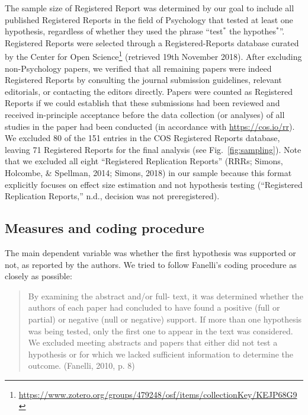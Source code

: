 \documentclass[british,,jou,floatsintext]{apa6}
\begin{document}
The sample size of Registered Report was determined by our goal to include all published Registered Reports in the field of Psychology that tested at least one hypothesis, regardless of whether they used the phrase \enquote{test\(^\ast\) the hypothes\(^\ast\)}.
Registered Reports were selected through a Registered-Reports database curated by the Center for Open Science\footnote{\url{https://www.zotero.org/groups/479248/osf/items/collectionKey/KEJP68G9}} (retrieved 19th November 2018).
After excluding non-Psychology papers, we verified that all remaining papers were indeed Registered Reports by consulting the journal submission guidelines, relevant editorials, or contacting the editors directly.
Papers were counted as Registered Reports if we could establish that these submissions had been reviewed and received in-principle acceptance before the data collection (or analyses) of all studies in the paper had been conducted (in accordance with \url{https://cos.io/rr}).
We excluded 80 of the 151 entries in the COS Registered Reports database, leaving 71 Registered Reports for the final analysis (see Fig.~\ref{fig:sampling}).
Note that we excluded all eight \enquote{Registered Replication Reports} (RRRs; Simons, Holcombe, \& Spellman, 2014; Simons, 2018) in our sample because this format explicitly focuses on effect size estimation and not hypothesis testing (``Registered Replication Reports,'' n.d., decision was not preregistered).

\hypertarget{measures-and-coding-procedure}{%
\subsection{Measures and coding procedure}\label{measures-and-coding-procedure}}

The main dependent variable was whether the first hypothesis was supported or not, as reported by the authors.
We tried to follow Fanelli's coding procedure as closely as possible:

\begin{quote}
By examining the abstract and/or full- text, it was determined whether the authors of each paper had concluded to have found a positive (full or partial) or negative (null or negative) support.
If more than one hypothesis was being tested, only the first one to appear in the text was considered.
We excluded meeting abstracts and papers that either did not test a hypothesis or for which we lacked sufficient information to determine the outcome. (Fanelli, 2010, p. 8)
\end{quote}
\end{document}
